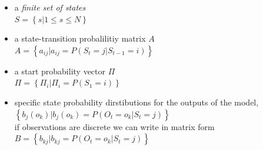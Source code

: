 \begin{itemize}
	\item a \emph{finite set of states} \\ 
	$ S = \left\{s | 1 \leq s \leq N \right\} $
	\item a state-transition probalilitiy matrix $A$ \\ 
	$A = \left\{ a_{ij} | a_{ij} = P(S_t = j | S_{t-1} = i) \right\}$
	\item a start probability vector $\Pi$ \\ 
	$ \Pi = \left\{ \Pi_i | \Pi_i = P(S_1 = i)  \right\}$
	\item specific state probability dirstibutions for the outputs of the model,  \\
	$\left\{ b_j(o_k) | b_j(o_k) = P(O_t = o_k | S_t = j) \right\}$ \\
	if observations are discrete we can write in matrix form \\
	$ B = \left\{ b_{kj} | b_{kj} = P(O_t = o_k | S_t = j) \right\} $
	
\end{itemize}
